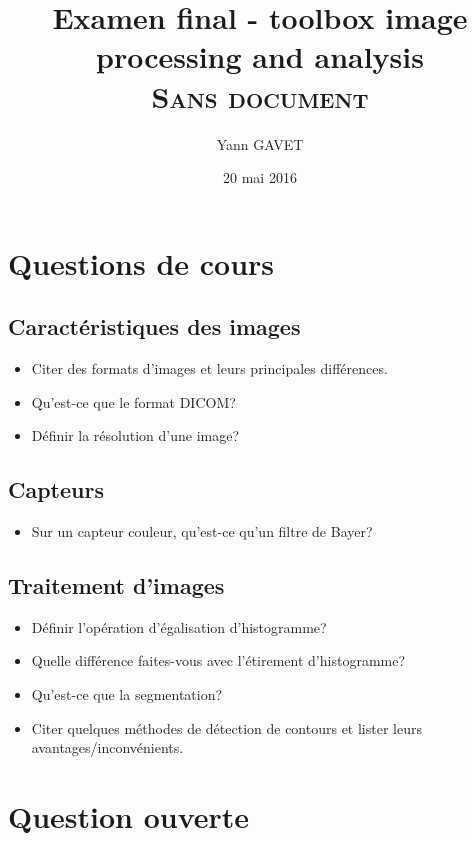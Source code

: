 \documentclass[a4paper,10pt]{article}
\title{Examen final - toolbox image processing and analysis\\
\textsc{Sans document}}
\author{Yann GAVET}
\date{20 mai 2016}
\begin{document}
\maketitle


\section{Questions de cours}
\subsection{Caractéristiques des images}
\begin{itemize}
 \item Citer des formats d'images et leurs principales différences.
 \item Qu'est-ce que le format DICOM?
 \item Définir la résolution d'une image?
\end{itemize}

\subsection{Capteurs}
\begin{itemize}
 \item Sur un capteur couleur, qu'est-ce qu'un filtre de Bayer? 
\end{itemize}


\subsection{Traitement d'images}
\begin{itemize}
 \item Définir l'opération d'égalisation d'histogramme?
 \item Quelle différence faites-vous avec l'étirement d'histogramme?
 \item Qu'est-ce que la segmentation? 
 \item Citer quelques méthodes de détection de contours et lister leurs avantages/inconvénients.
\end{itemize}

\section{Question ouverte}
\end{document}
